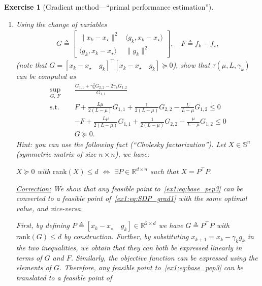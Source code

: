 \documentclass[11pt,a4paper]{article}
\newcommand{\correction}[1]{{{\color{blue}\underline{Correction:} #1}}}
\newcommand{\correction}[1]{}
\newtheorem{exercise}{Exercise}
\begin{document}
\begin{exercise}[Gradient method---``primal performance estimation'']
\begin{enumerate}
	\correction{From , there exists an $L$-smooth $\mu$-strongly convex function satisfying $g_k=\nabla f(x_k)$, $g_\star=\nabla f(x_\star)$, $f_k=f(x_k)$ and $f_\star=f(x_\star)$ if and only if those inequalities are satisfied. Hence any feasible point to~\eqref{ex1:eq:base_pep3} can be converted to a feasible point to~\eqref{ex1:eq:base_pep2} and vice-versa (\Cref{thm:interp_smoothstronglyconvex} provides necessary and sufficient conditions).}
	\item Using the change of variables
			\begin{align}\label{ex1:eq:GRAM}
			G \triangleq \begin{bmatrix}
			\|x_k-x_\star\|^2 & \langle g_k,x_k-x_\star\rangle\\
			\langle g_k, x_k-x_\star\rangle & \| g_k\|^2
			\end{bmatrix},\quad 	F \triangleq 			f_k-f_\star,
			\end{align}
			(note that $G=[x_k-x_\star \quad g_k]^\top [x_k-x_\star \quad g_k]\succcurlyeq 0$), show that $\tau(\mu,L,\gamma_k)$ can be computed as
			\begin{equation}\label{ex1:eq:SDP_grad1}
			\begin{aligned}
			\sup_{G,\, F} \quad & \frac{G_{1,1}+\gamma_k ^2 G_{2,2}-2\gamma_k G_{1,2}}{G_{1,1}}\\
			\text{s.t. } \quad & F + \tfrac{L\mu}{2(L-\mu)} G_{1,1}+\tfrac{1}{2(L-\mu)}G_{2,2}-\tfrac{L}{L-\mu}G_{1,2}\leqslant 0\\
			&-F + \tfrac{L\mu}{2(L-\mu)} G_{1,1}+\tfrac{1}{2(L-\mu)}G_{2,2}-\tfrac{\mu}{L-\mu}G_{1,2}\leqslant 0\\
			&G\succcurlyeq 0.
			\end{aligned}
			\end{equation}
	Hint: you can use the following fact (``Cholesky factorization''). Let $X\in \mathbb{S}^n$ (symmetric matrix of size $n\times n$), we have:
	\begin{center}
	$X\succcurlyeq 0$ with $\mathrm{rank}(X)\leqslant d$ $\Leftrightarrow$ $\exists P\in\mathbb{R}^{d\times n}$ such that $X=P^\top\! P$.
	\end{center}
	
	
	\correction{We show that any feasible point to~\eqref{ex1:eq:base_pep3} can be converted to a feasible point of~\eqref{ex1:eq:SDP_grad1} with the same optimal value, and vice-versa.
	
	First, by defining $P\triangleq[x_k-x_\star \quad g_k]\in\mathbb{R}^{2\times d}$ we have $G\triangleq P^{\top\!}P$ with $\mathrm{rank}(G)\leq d$ by construction. Further, by substituting $x_{k+1}=x_k-\gamma_k g_k$ in the two inequalities, we obtain that they can both be expressed linearly in terms of $G$ and $F$. Similarly, the objective function can be expressed using the elements of $G$. Therefore, any feasible point to~\eqref{ex1:eq:base_pep3} can be translated to a feasible point of

}
\end{enumerate}
\end{exercise}
\end{document}
